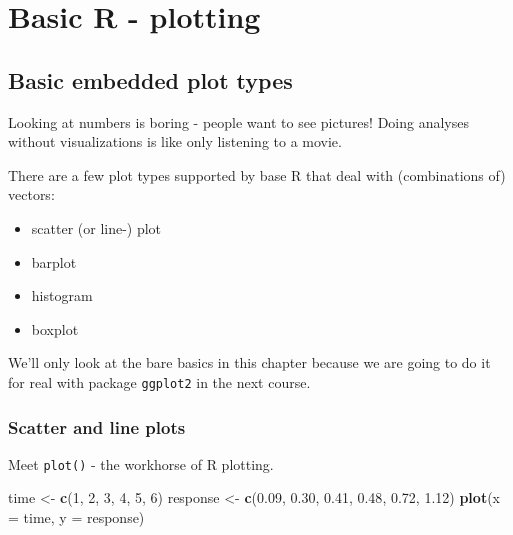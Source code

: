 \documentclass[]{book}
\newenvironment{Shaded}{\begin{snugshade}}{\end{snugshade}}
\newcommand{\DataTypeTok}[1]{\textcolor[rgb]{0.13,0.29,0.53}{#1}}
\newcommand{\DecValTok}[1]{\textcolor[rgb]{0.00,0.00,0.81}{#1}}
\newcommand{\FloatTok}[1]{\textcolor[rgb]{0.00,0.00,0.81}{#1}}
\newcommand{\KeywordTok}[1]{\textcolor[rgb]{0.13,0.29,0.53}{\textbf{#1}}}
\newcommand{\NormalTok}[1]{#1}
\newcommand{\StringTok}[1]{\textcolor[rgb]{0.31,0.60,0.02}{#1}}
\providecommand{\tightlist}{%
  \setlength{\itemsep}{0pt}\setlength{\parskip}{0pt}}
\begin{document}
\hypertarget{basic-r---plotting}{%
\chapter{Basic R - plotting}\label{basic-r---plotting}}

\hypertarget{basic-embedded-plot-types}{%
\section{Basic embedded plot types}\label{basic-embedded-plot-types}}

Looking at numbers is boring - people want to see pictures! Doing analyses without visualizations is like only listening to a movie.

There are a few plot types supported by base R that deal with (combinations of) vectors:

\begin{itemize}
\tightlist
\item
  scatter (or line-) plot
\item
  barplot
\item
  histogram
\item
  boxplot
\end{itemize}

We'll only look at the bare basics in this chapter because we are going to do it for real with package \texttt{ggplot2} in the next course.

\hypertarget{scatter-and-line-plots}{%
\subsection{Scatter and line plots}\label{scatter-and-line-plots}}

Meet \texttt{plot()} - the workhorse of R plotting.

\begin{Shaded}
\begin{Highlighting}[]
\NormalTok{time <-}\StringTok{ }\KeywordTok{c}\NormalTok{(}\DecValTok{1}\NormalTok{, }\DecValTok{2}\NormalTok{, }\DecValTok{3}\NormalTok{, }\DecValTok{4}\NormalTok{, }\DecValTok{5}\NormalTok{, }\DecValTok{6}\NormalTok{)}
\NormalTok{response <-}\StringTok{ }\KeywordTok{c}\NormalTok{(}\FloatTok{0.09}\NormalTok{, }\FloatTok{0.30}\NormalTok{, }\FloatTok{0.41}\NormalTok{, }\FloatTok{0.48}\NormalTok{, }\FloatTok{0.72}\NormalTok{, }\FloatTok{1.12}\NormalTok{)}
\KeywordTok{plot}\NormalTok{(}\DataTypeTok{x =}\NormalTok{ time, }\DataTypeTok{y =}\NormalTok{ response)}
\end{Highlighting}
\end{Shaded}
\end{document}
